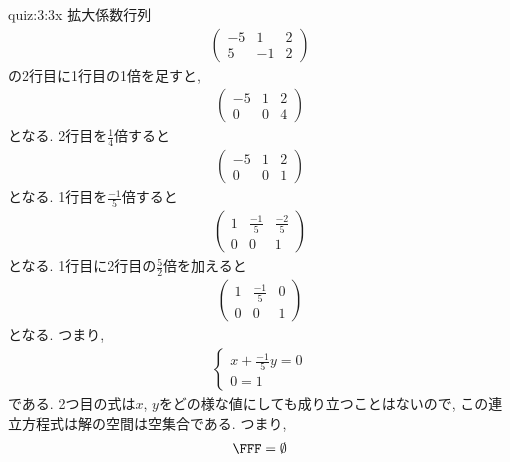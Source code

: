 \begin{answerof}{quiz:3:3x}
  拡大係数行列
  \begin{align*}
    \begin{pmatrix}-5&1&2\\5&-1&2\end{pmatrix}
  \end{align*}
  の2行目に1行目の1倍を足すと,
  \begin{align*}
    \begin{pmatrix}-5&1&2\\0&0&4\end{pmatrix}
  \end{align*}
  となる.
  2行目を$\frac{1}{4}$倍すると
  \begin{align*}
    \begin{pmatrix}-5&1&2\\0&0&1\end{pmatrix}
  \end{align*}
  となる.
  1行目を$\frac{-1}{5}$倍すると
  \begin{align*}
    \begin{pmatrix}1&\frac{-1}{5}&\frac{-2}{5}\\0&0&1\end{pmatrix}
  \end{align*}
  となる.
  1行目に2行目の$\frac{5}{2}$倍を加えると
  \begin{align*}
    \begin{pmatrix}1&\frac{-1}{5}&0\\0&0&1\end{pmatrix}
  \end{align*}
  となる.
  つまり,
  \begin{align*}
    \begin{cases}
      x+\frac{-1}{5}y=0\\
      0=1
    \end{cases}
  \end{align*}
  である.
  2つ目の式は$x$, $y$をどの様な値にしても成り立つことはないので,
  この連立方程式は解の空間は空集合である.
  つまり,
  \begin{align*}\FFF=\emptyset\end{align*}
\end{answerof}



